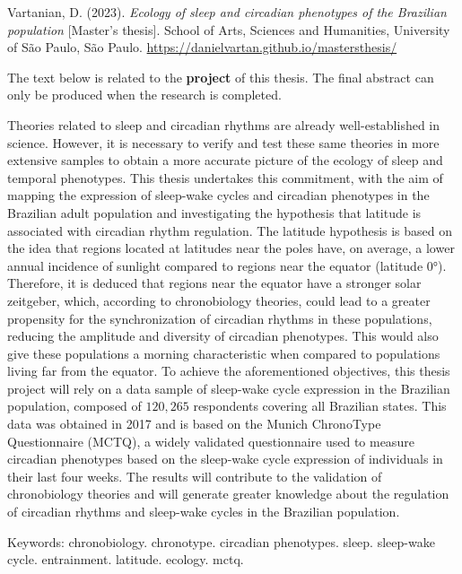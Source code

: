 \setlength{\absparsep}{18pt}
\begin{resumo}
Vartanian, D. (2023). \emph{Ecology of sleep and circadian phenotypes of
the Brazilian population} {[}Master's thesis{]}. School of Arts,
Sciences and Humanities, University of São Paulo, São Paulo.
\url{https://danielvartan.github.io/mastersthesis/}

The text below is related to the \textbf{project} of this thesis. The
final abstract can only be produced when the research is completed.

Theories related to sleep and circadian rhythms are already
well-established in science. However, it is necessary to verify and test
these same theories in more extensive samples to obtain a more accurate
picture of the ecology of sleep and temporal phenotypes. This thesis
undertakes this commitment, with the aim of mapping the expression of
sleep-wake cycles and circadian phenotypes in the Brazilian adult
population and investigating the hypothesis that latitude is associated
with circadian rhythm regulation. The latitude hypothesis is based on
the idea that regions located at latitudes near the poles have, on
average, a lower annual incidence of sunlight compared to regions near
the equator (latitude 0°). Therefore, it is deduced that regions near
the equator have a stronger solar zeitgeber, which, according to
chronobiology theories, could lead to a greater propensity for the
synchronization of circadian rhythms in these populations, reducing the
amplitude and diversity of circadian phenotypes. This would also give
these populations a morning characteristic when compared to populations
living far from the equator. To achieve the aforementioned objectives,
this thesis project will rely on a data sample of sleep-wake cycle
expression in the Brazilian population, composed of \(120,265\)
respondents covering all Brazilian states. This data was obtained in
2017 and is based on the Munich ChronoType Questionnaire (MCTQ), a
widely validated questionnaire used to measure circadian phenotypes
based on the sleep-wake cycle expression of individuals in their last
four weeks. The results will contribute to the validation of
chronobiology theories and will generate greater knowledge about the
regulation of circadian rhythms and sleep-wake cycles in the Brazilian
population.

Keywords: chronobiology. chronotype. circadian phenotypes. sleep.
sleep-wake cycle. entrainment. latitude. ecology. mctq.
\end{resumo}

